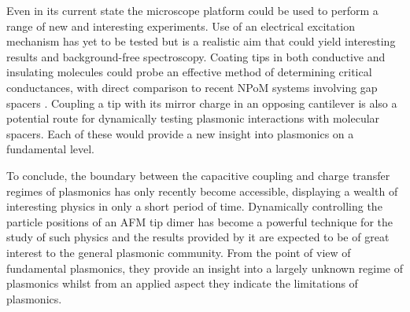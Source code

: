 \documentclass[12pt, a4paper, oneside]{book}
\begin{document}
Even in its current state the microscope platform could be used to perform a range of new and interesting experiments. Use of an electrical excitation mechanism has yet to be tested but is a realistic aim that could yield interesting results and background-free spectroscopy. Coating tips in both conductive and insulating molecules could probe an effective method of determining critical conductances, with direct comparison to recent NPoM systems involving gap spacers \cite{mertens2013, benz2014, denijs2014}. Coupling a tip with its mirror charge in an opposing cantilever is also a potential route for dynamically testing plasmonic interactions with molecular spacers. Each of these would provide a new insight into plasmonics on a fundamental level.

To conclude, the boundary between the capacitive coupling and charge transfer regimes of plasmonics has only recently become accessible, displaying a wealth of interesting physics in only a short period of time. Dynamically controlling the particle positions of an AFM tip dimer has become a powerful technique for the study of such physics and the results provided by it are expected to be of great interest to the general plasmonic community. From the point of view of fundamental plasmonics, they provide an insight into a largely unknown regime of plasmonics whilst from an applied aspect they indicate the limitations of plasmonics.

\ifstandalone
\begin{singlespace}
\fontsize{8pt}{1em}\selectfont
\printbibliography[notcategory=fullcited]
\end{singlespace}
\fi
\end{document}

